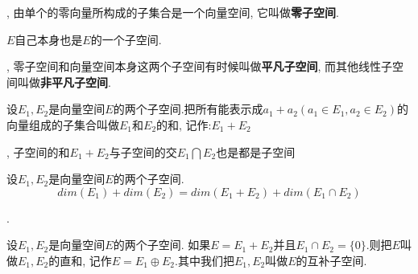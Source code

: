 \documentclass[a4paper,11pt]{article}
\theoremstyle{mystyle}
\begin{document}
, 由单个的零向量所构成的子集合是一个向量空间, 它叫做\textbf{零子空间}.

$E$自己本身也是$E$的一个子空间.

, 零子空间和向量空间本身这两个子空间有时候叫做\textbf{平凡子空间}, 而其他线性子空间叫做\textbf{非平凡子空间}.
\begin{definition}[子空间的和]
  设$E_1,E_2$是向量空间$E$的两个子空间.把所有能表示成$a_1+a_2(a_1\in E_1,a_2\in E_2)$的向量组成的子集合叫做$E_1$和$E_2$的和, 记作:$E_1+E_2$
\end{definition}
, 子空间的和$E_1+E_2$与子空间的交$E_1\bigcap E_2$也是都是子空间
\begin{definition}
  设$E_1,E_2$是向量空间$E$的两个子空间.
  \begin{equation*}
    dim(E_1)+dim(E_2)=dim(E_1+E_2)+dim(E_1\cap E_2)
  \end{equation*}
\end{definition}
.
\begin{definition}[子空间的直和]
  设$E_1,E_2$是向量空间$E$的两个子空间. 如果$E=E_1+E_2$并且$E_1\cap E_2=\{0\}$.则把$E$叫做$E_1,E_2$的直和, 记作$E=E_1\oplus E_2$.其中我们把$E_1,E_2$叫做$E$的互补子空间.
\end{definition}
\end{document}
